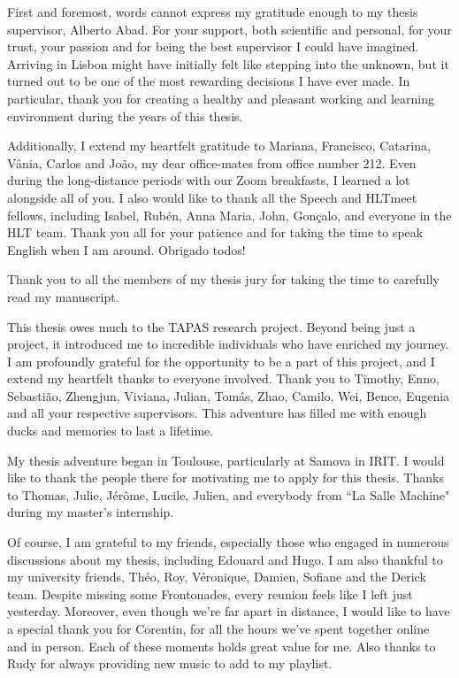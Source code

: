 
First and foremost, words cannot express my gratitude enough to my thesis supervisor, Alberto Abad. For your support, both scientific and personal, for your trust, your passion and for being the best supervisor I could have imagined. Arriving in Lisbon might have initially felt like stepping into the unknown, but it turned out to be one of the most rewarding decisions I have ever made. In particular, thank you for creating a healthy and pleasant working and learning environment during the years of this thesis. 

Additionally, I extend my heartfelt gratitude to Mariana, Francisco, Catarina, Vânia, Carlos and João, my dear office-mates from office number 212. Even during the long-distance periods with our Zoom breakfasts, I learned a lot alongside all of you. I also would like to thank all the Speech and HLTmeet fellows, including Isabel, Rubén, Anna Maria, John, Gonçalo, and everyone in the HLT team. Thank you all for your patience and for taking the time to speak English when I am around. Obrigado todos! 

Thank you to all the members of my thesis jury for taking the time to carefully read my manuscript.

This thesis owes much to the TAPAS research project. Beyond being just a project, it introduced me to incredible individuals who have enriched my journey. I am profoundly grateful for the opportunity to be a part of this project, and I extend my heartfelt thanks to everyone involved. Thank you to Timothy, Enno, Sebastião, Zhengjun, Viviana, Julian, Tomás, Zhao, Camilo, Wei, Bence, Eugenia and all your respective supervisors. This adventure has filled me with enough ducks and memories to last a lifetime.

My thesis adventure began in Toulouse, particularly at Samova in IRIT. I would like to thank the people there for motivating me to apply for this thesis. Thanks to Thomas, Julie, Jérôme, Lucile, Julien, and everybody from ``La Salle Machine" during my master's internship. 

Of course, I am grateful to my friends, especially those who engaged in numerous discussions about my thesis, including Edouard and Hugo. I am also thankful to my university friends, Théo, Roy, Véronique, Damien, Sofiane and the Derick team. Despite missing some Frontonades, every reunion feels like I left just yesterday. Moreover, even though we're far apart in distance, I would like to have a special thank you for Corentin, for all the hours we've spent together online and in person. Each of these moments holds great value for me. Also thanks to Rudy for always providing new music to add to my playlist.


